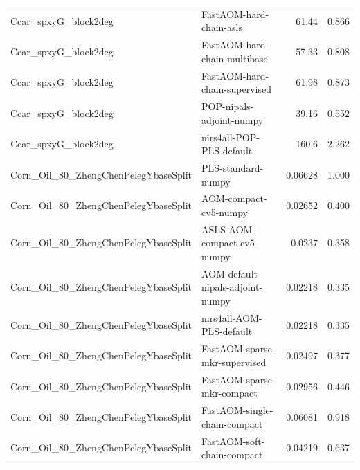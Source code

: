 \begin{landscape}
\begin{longtable}{L{8.0cm}L{9.5cm}rr}
Ccar\_\allowbreak{}spxyG\_\allowbreak{}block2deg & FastAOM-\allowbreak{}hard-\allowbreak{}chain-\allowbreak{}asls & 61.44 & 0.866 \\
Ccar\_\allowbreak{}spxyG\_\allowbreak{}block2deg & FastAOM-\allowbreak{}hard-\allowbreak{}chain-\allowbreak{}multibase & 57.33 & 0.808 \\
Ccar\_\allowbreak{}spxyG\_\allowbreak{}block2deg & FastAOM-\allowbreak{}hard-\allowbreak{}chain-\allowbreak{}supervised & 61.98 & 0.873 \\
Ccar\_\allowbreak{}spxyG\_\allowbreak{}block2deg & POP-\allowbreak{}nipals-\allowbreak{}adjoint-\allowbreak{}numpy & 39.16 & 0.552 \\
Ccar\_\allowbreak{}spxyG\_\allowbreak{}block2deg & nirs4all-\allowbreak{}POP-\allowbreak{}PLS-\allowbreak{}default & 160.6 & 2.262 \\
Corn\_\allowbreak{}Oil\_\allowbreak{}80\_\allowbreak{}ZhengChenPelegYbaseSplit & PLS-\allowbreak{}standard-\allowbreak{}numpy & 0.06628 & 1.000 \\
Corn\_\allowbreak{}Oil\_\allowbreak{}80\_\allowbreak{}ZhengChenPelegYbaseSplit & AOM-\allowbreak{}compact-\allowbreak{}cv5-\allowbreak{}numpy & 0.02652 & 0.400 \\
Corn\_\allowbreak{}Oil\_\allowbreak{}80\_\allowbreak{}ZhengChenPelegYbaseSplit & ASLS-\allowbreak{}AOM-\allowbreak{}compact-\allowbreak{}cv5-\allowbreak{}numpy & 0.0237 & 0.358 \\
Corn\_\allowbreak{}Oil\_\allowbreak{}80\_\allowbreak{}ZhengChenPelegYbaseSplit & AOM-\allowbreak{}default-\allowbreak{}nipals-\allowbreak{}adjoint-\allowbreak{}numpy & 0.02218 & 0.335 \\
Corn\_\allowbreak{}Oil\_\allowbreak{}80\_\allowbreak{}ZhengChenPelegYbaseSplit & nirs4all-\allowbreak{}AOM-\allowbreak{}PLS-\allowbreak{}default & 0.02218 & 0.335 \\
Corn\_\allowbreak{}Oil\_\allowbreak{}80\_\allowbreak{}ZhengChenPelegYbaseSplit & FastAOM-\allowbreak{}sparse-\allowbreak{}mkr-\allowbreak{}supervised & 0.02497 & 0.377 \\
Corn\_\allowbreak{}Oil\_\allowbreak{}80\_\allowbreak{}ZhengChenPelegYbaseSplit & FastAOM-\allowbreak{}sparse-\allowbreak{}mkr-\allowbreak{}compact & 0.02956 & 0.446 \\
Corn\_\allowbreak{}Oil\_\allowbreak{}80\_\allowbreak{}ZhengChenPelegYbaseSplit & FastAOM-\allowbreak{}single-\allowbreak{}chain-\allowbreak{}compact & 0.06081 & 0.918 \\
Corn\_\allowbreak{}Oil\_\allowbreak{}80\_\allowbreak{}ZhengChenPelegYbaseSplit & FastAOM-\allowbreak{}soft-\allowbreak{}chain-\allowbreak{}compact & 0.04219 & 0.637 \\

\end{longtable}
\end{landscape}
